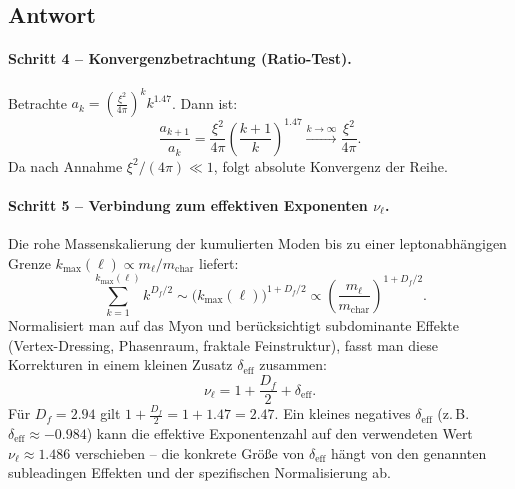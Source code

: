 \documentclass[12pt,a4paper]{article}
\theoremstyle{remark}
\newenvironment{answer}{\subsection*{Antwort}}{\vspace{1em}}
\begin{document}
\begin{answer}
	\paragraph{Schritt 4 – Konvergenzbetrachtung (Ratio-Test).}
	Betrachte \( a_k = \left( \frac{\xi^2}{4\pi} \right)^k k^{1.47} \). Dann ist:
	\begin{equation}
		\frac{a_{k+1}}{a_k} = \frac{\xi^2}{4\pi} \left( \frac{k+1}{k} \right)^{1.47} \xrightarrow{k \to \infty} \frac{\xi^2}{4\pi}.
	\end{equation}
	Da nach Annahme \( \xi^2 / (4\pi) \ll 1 \), folgt absolute Konvergenz der Reihe.
	
	\paragraph{Schritt 5 – Verbindung zum effektiven Exponenten \( \nu_\ell \).}
	Die rohe Massenskalierung der kumulierten Moden bis zu einer leptonabhängigen Grenze \( k_{\max}(\ell) \propto m_\ell / m_{\text{char}} \) liefert:
	\begin{equation}
		\sum_{k=1}^{k_{\max}(\ell)} k^{D_f / 2} \sim \big( k_{\max}(\ell) \big)^{1 + D_f / 2} \propto \left( \frac{m_\ell}{m_{\text{char}}} \right)^{1 + D_f / 2}.
	\end{equation}
	Normalisiert man auf das Myon und berücksichtigt subdominante Effekte (Vertex-Dressing, Phasenraum, fraktale Feinstruktur), fasst man diese Korrekturen in einem kleinen Zusatz \( \delta_{\text{eff}} \) zusammen:
	\begin{equation}
		\nu_\ell = 1 + \frac{D_f}{2} + \delta_{\text{eff}}.
	\end{equation}
	Für \( D_f = 2.94 \) gilt \( 1 + \frac{D_f}{2} = 1 + 1.47 = 2.47 \). Ein kleines negatives \( \delta_{\text{eff}} \) (z.\,B. \( \delta_{\text{eff}} \approx -0.984 \)) kann die effektive Exponentenzahl auf den verwendeten Wert \( \nu_\ell \approx 1.486 \) verschieben – die konkrete Größe von \( \delta_{\text{eff}} \) hängt von den genannten subleadingen Effekten und der spezifischen Normalisierung ab.
	

\end{answer}
\end{document}
